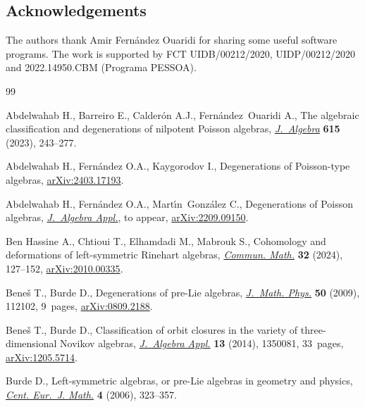 \documentclass[pdftex]{sigma}
\numberwithin{equation}{section}
\begin{document}
\subsection*{Acknowledgements}

The authors thank Amir Fern\'andez Ouaridi for sharing some useful software programs.
The work is supported by
FCT UIDB/00212/2020, UIDP/00212/2020 and 2022.14950.CBM (Programa PESSOA).

\begin{thebibliography}{99}
\footnotesize\itemsep=0pt

Abdelwahab H., Barreiro E., Calder\'on A.J., Fern\'andez~Ouaridi A., The
 algebraic classification and degenerations of nilpotent {P}oisson algebras,
 \href{https://doi.org/10.1016/j.jalgebra.2022.10.018}{\textit{J.~Algebra}} \textbf{615} (2023), 243--277.

Abdelwahab H., Fern\'andez O.A., Kaygorodov I., Degenerations of {P}oisson-type
 algebras, \href{https://arxiv.org/abs/2403.17193}{arXiv:2403.17193}.

Abdelwahab H., Fern\'andez O.A., Mart\'{\i}n~Gonz\'alez C., Degenerations of
 {P}oisson algebras, \href{https://doi.org/10.1142/S0219498825500872}{\textit{J.~Algebra Appl.}}, {t}o appear,
 \href{https://arxiv.org/abs/2209.09150}{arXiv:2209.09150}.

Ben Hassine A., Chtioui T., Elhamdadi M., Mabrouk S., Cohomology and
 deformations of left-symmetric {R}inehart algebras, \href{https://doi.org/10.46298/cm.12656}{\textit{Commun. Math.}}
 \textbf{32} (2024), 127--152, \href{https://arxiv.org/abs/2010.00335}{arXiv:2010.00335}.


Bene\v{s} T., Burde D., Degenerations of pre-{L}ie algebras, \href{https://doi.org/10.1063/1.3246608}{\textit{J.~Math.
 Phys.}} \textbf{50} (2009), 112102, 9~pages, \href{https://arxiv.org/abs/0809.2188}{arXiv:0809.2188}.

Bene\v{s} T., Burde D., Classification of orbit closures in the variety of
 three-dimensional {N}ovikov algebras, \href{https://doi.org/10.1142/S0219498813500813}{\textit{J.~Algebra Appl.}} \textbf{13}
 (2014), 1350081, 33~pages, \href{https://arxiv.org/abs/1205.5714}{arXiv:1205.5714}.

Burde D., Left-symmetric algebras, or pre-{L}ie algebras in geometry and
 physics, \href{https://doi.org/10.2478/s11533-006-0014-9}{\textit{Cent. Eur.~J. Math.}} \textbf{4} (2006), 323--357.


\end{thebibliography}
\end{document}
